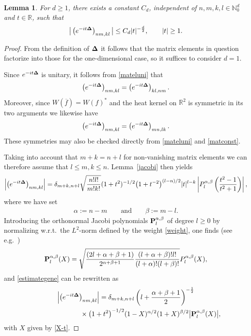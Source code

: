 \documentclass[10pt,a4paper]{amsart}
\newtheorem{lemma}{Lemma}
\begin{document}
\begin{lemma}
\label{Uniest1}
For $d\geq 1$, there exists a constant $C_d$, independent of $n,m,k,l
\in\mathbb N_0^d$ and
$t\in\mathbb R$, such that
\begin{gather}\label{decay0}
\big|\left(e^{-it{\bf\Delta}}\right)_{nm,kl}\big| \leq  C_d |t|^{-\frac
d2} ,\qquad |t|\geq 1 .
\end{gather}
\end{lemma}

\begin{proof} From the def\/inition of ${\bf\Delta}$ it follows that the
  matrix elements in question factorize into those for the
  one-dimensional case, so it suf\/f\/ices to consider $d=1$.

 Since $e^{-it{\bf\Delta}}$ is unitary, it follows from
  \eqref{mateluni} that
 \[
\left(e^{-it{\bf\Delta}}\right)_{nm,kl} =  \left(e^{-it{\bf\Delta}}\right)_{kl,nm}.
\]
 Moreover, since
$W(\overline f)=W(f)^*$ and the heat kernel on $\mathbb R^2$ is
symmetric in its two arguments we likewise have
 \[
\left(e^{-it{\bf\Delta}}\right)_{nm,kl} =  \left(e^{-it{\bf\Delta}}\right)_{mn,lk} .
\]
These symmetries may also be checked directly from \eqref{mateluni} and \eqref{matconst}.

Taking into account that $m+k=n+l$ for non-vanishing matrix elements
we can therefore assume that $l\leq m,k\leq n$. Lemma~\ref{jacobi} then yields
\begin{gather}
\label{estimategene}
\left|\left(e^{-it{\bf\Delta}}\right)_{nm,kl}\right|
 = \delta_{m+k,n+l}
\sqrt{\frac{n! l!}{m! k!}}(1+t^2)^{-1/2}
\big(1+t^{-2}\big)^{(l-n)/2}|t|^{l-k}
\left|P_l^{\alpha,\beta}\left(\frac{t^2-1}{t^2+1}\right)\right|,
\end{gather}
where we have set
\begin{gather*}%
\alpha:=n-m \qquad\mbox{and}\qquad \beta:=m-l .
\end{gather*}
Introducing the orthonormal Jacobi polynomials ${\bf
  P}_l^{\alpha,\beta}$ of degree $l\geq 0$ by normalizing w.r.t.\ the
$L^2$-norm def\/ined by the weight \eqref{weight}, one f\/inds (see e.g.~\cite[p.~67]{Szego})
\[
{\bf P}_l^{\alpha,\beta}(X)  =  \sqrt{\frac{(2l+\alpha +\beta +1)}{2^{\alpha
    +\beta +1}}\frac{(l+\alpha +\beta)! l!}{(l+\alpha)! (l+\beta)!}}
P_l^{\alpha,\beta}(X) ,
\]
and \eqref{estimategene} can be rewritten as
\begin{gather}
\left|\left(e^{-it{\bf\Delta}}\right)_{nm,kl}\right|
 = \delta_{m+k,n+l}\left(l+\frac{\alpha +\beta +1}2\right)^{-\frac 12}\nonumber\\
 \hphantom{\left|\left(e^{-it{\bf\Delta}}\right)_{nm,kl}\right|=}{}\times
\big(1+t^2\big)^{-1/2} (1-X)^{\alpha/2}(1+X)^{\beta/2}
\big|{\bf P}_l^{\alpha,\beta}(X)\big| ,\label{estimategene2}
\end{gather}
with $X$ given by \eqref{X-t}.


\end{proof}
\end{document}
